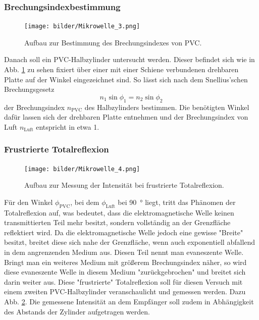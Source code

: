 		\subsubsection*{Brechungsindexbestimmung}
		\begin{figure}[ht]
			\centering
			\texttt{[image: bilder/Mikrowelle\_3.png]}
			\caption{Aufbau zur Bestimmung des Brechungsindexes von PVC.\cite{WWU}}
			\label{fig:Aufbau3}	
		\end{figure}
		Danach soll ein PVC-Halbzylinder untersucht werden. 
		Dieser befindet sich wie in Abb. \ref{fig:Aufbau3} zu sehen fixiert über einer mit einer Schiene verbundenen drehbaren Platte auf der Winkel eingezeichnet sind.
		So lässt sich nach dem Snellius'schen Brechungsgesetz
		\begin{equation} \label{eq:snell}
			n_1 \sin{\phi_1} = n_2 \sin{\phi_2}
		\end{equation}
		der Brechungsindex $n_\text{PVC}$ des Halbzylinders bestimmen. 
		Die benötigten Winkel dafür lassen sich der drehbaren Platte entnehmen und der Brechungsindex von Luft $n_\text{Luft}$ entspricht in etwa 1.
		
		\subsubsection*{Frustrierte Totalreflexion}
		\begin{figure}[ht]
			\centering
			\texttt{[image: bilder/Mikrowelle\_4.png]}
			\caption{Aufbau zur Messung der Intensität bei frustrierte Totalreflexion.\cite{WWU}}
			\label{fig:Aufbau4}	
		\end{figure}
		Für den Winkel $\phi_\text{PVC}$, bei dem $\phi_\text{Luft}$ bei \SI{90}{\degree} liegt, tritt das Phänomen der Totalreflexion auf, was bedeutet, dass die elektromagnetische Welle keinen transmittierten Teil mehr besitzt, sondern vollständig an der Grenzfläche reflektiert wird. 
		Da die elektromagnetische Welle jedoch eine gewisse "Breite" besitzt, breitet diese sich nahe der Grenzfläche, wenn auch exponentiell abfallend in dem angrenzenden Medium aus.
		Diesen Teil nennt man evaneszente Welle.
		Bringt man ein weiteres Medium mit größerem Brechungsindex näher, so wird diese evaneszente Welle in diesem Medium "zurückgebrochen" und breitet sich darin weiter aus.
		Diese "frustrierte" Totalreflexion soll für diesen Versuch mit einem zweiten PVC-Halbzylinder veranschaulicht und gemessen werden. 
		Dazu Abb. \ref{fig:Aufbau4}.
		Die gemessene Intensität an dem Empfänger soll zudem in Abhängigkeit des Abstands der Zylinder aufgetragen werden.		
		
